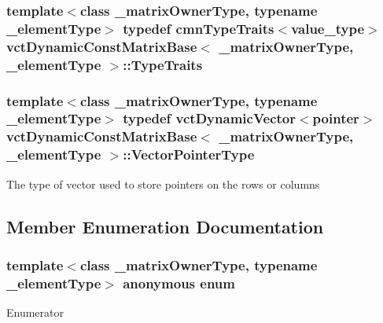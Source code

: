 \subsubsection[{Type\+Traits}]{\setlength{\rightskip}{0pt plus 5cm}template$<$class \+\_\+matrix\+Owner\+Type, typename \+\_\+element\+Type$>$ typedef {\bf cmn\+Type\+Traits}$<$value\+\_\+type$>$ {\bf vct\+Dynamic\+Const\+Matrix\+Base}$<$ \+\_\+matrix\+Owner\+Type, \+\_\+element\+Type $>$\+::{\bf Type\+Traits}}\label{classvct_dynamic_const_matrix_base_a42f1e63cd9923069111d907ec98ac6ee}
\hypertarget{classvct_dynamic_const_matrix_base_aa3fdaf7217ea2667db03af719c3371c4}{}
\subsubsection[{Vector\+Pointer\+Type}]{\setlength{\rightskip}{0pt plus 5cm}template$<$class \+\_\+matrix\+Owner\+Type, typename \+\_\+element\+Type$>$ typedef {\bf vct\+Dynamic\+Vector}$<$pointer$>$ {\bf vct\+Dynamic\+Const\+Matrix\+Base}$<$ \+\_\+matrix\+Owner\+Type, \+\_\+element\+Type $>$\+::{\bf Vector\+Pointer\+Type}}\label{classvct_dynamic_const_matrix_base_aa3fdaf7217ea2667db03af719c3371c4}
The type of vector used to store pointers on the rows or columns 

\subsection{Member Enumeration Documentation}
\hypertarget{classvct_dynamic_const_matrix_base_ad4b10a99ce01d58a9d7049bf0f28ee95}{}\subsubsection[{anonymous enum}]{\setlength{\rightskip}{0pt plus 5cm}template$<$class \+\_\+matrix\+Owner\+Type, typename \+\_\+element\+Type$>$ anonymous enum}\label{classvct_dynamic_const_matrix_base_ad4b10a99ce01d58a9d7049bf0f28ee95}
\begin{Desc}
\item[Enumerator]\par
\begin{description}
\item[{\em 
\hypertarget{classvct_dynamic_const_matrix_base_ad4b10a99ce01d58a9d7049bf0f28ee95a7101e5e87be1df37bf896f120fa37d10}{}D\+I\+M\+E\+N\+S\+I\+O\+N\label{classvct_dynamic_const_matrix_base_ad4b10a99ce01d58a9d7049bf0f28ee95a7101e5e87be1df37bf896f120fa37d10}
}]\end{description}
\end{Desc}


